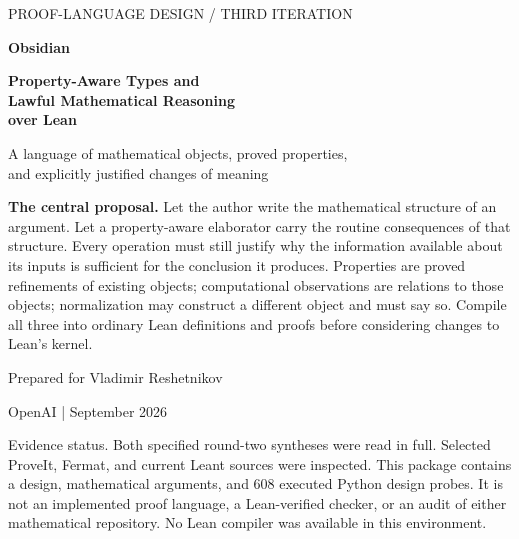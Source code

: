 \documentclass[11pt,a4paper]{article}
\theoremstyle{plain}\newtheorem{proposition}{Proposition}[section]
\theoremstyle{definition}\newtheorem{definition}[proposition]{Definition}
\theoremstyle{remark}\newtheorem{remark}[proposition]{Remark}
\begin{document}
\begin{titlepage}
\vspace*{5mm}
{\sffamily\small\color{accent}PROOF-LANGUAGE DESIGN \quad / \quad THIRD ITERATION\par}
\vspace{12mm}
{\sffamily\bfseries\color{ink}\fontsize{40}{44}\selectfont Obsidian\par}
\vspace{5mm}
{\sffamily\bfseries\color{ink}\fontsize{25}{31}\selectfont Property-Aware Types and\\Lawful Mathematical Reasoning\\over Lean\par}
\vspace{9mm}
{\sffamily\Large A language of mathematical objects, proved properties,\\and explicitly justified changes of meaning\par}
\vspace{11mm}
\begin{claimbox}
\textbf{The central proposal.} Let the author write the mathematical structure of an argument. Let a property-aware elaborator carry the routine consequences of that structure. Every operation must still justify why the information available about its inputs is sufficient for the conclusion it produces. Properties are proved refinements of existing objects; computational observations are relations to those objects; normalization may construct a different object and must say so. Compile all three into ordinary Lean definitions and proofs before considering changes to Lean's kernel.
\end{claimbox}
\vfill
{\sffamily Prepared for Vladimir Reshetnikov\par}
{\sffamily OpenAI \quad |  September 2026\par}
\vspace{5mm}
{\small\color{muted}Evidence status. Both specified round-two syntheses were read in full. Selected ProveIt, Fermat, and current Leant sources were inspected. This package contains a design, mathematical arguments, and 608 executed Python design probes. It is not an implemented proof language, a Lean-verified checker, or an audit of either mathematical repository. No Lean compiler was available in this environment.\par}
\end{titlepage}
\end{document}
